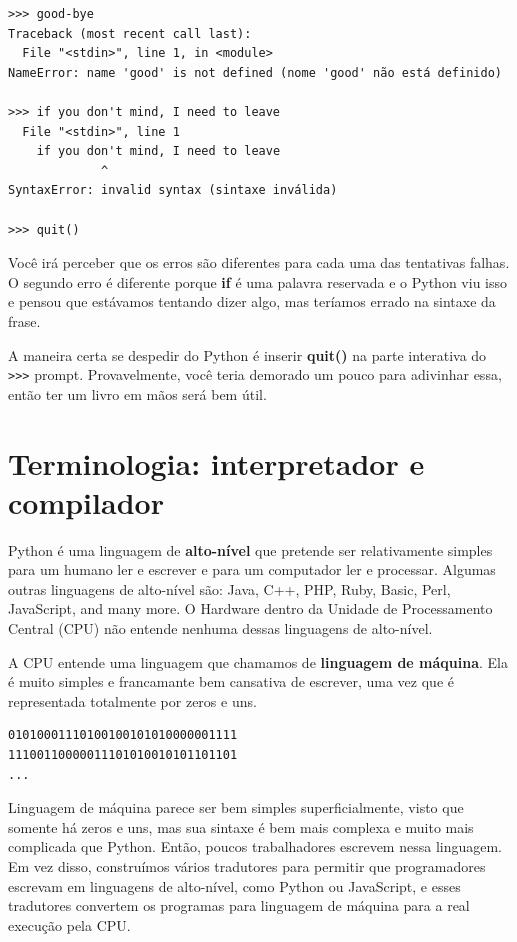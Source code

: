 \begin{verbatim}
>>> good-bye
Traceback (most recent call last):
  File "<stdin>", line 1, in <module>
NameError: name 'good' is not defined (nome 'good' não está definido)

>>> if you don't mind, I need to leave
  File "<stdin>", line 1
    if you don't mind, I need to leave
             ^
SyntaxError: invalid syntax (sintaxe inválida)

>>> quit()
\end{verbatim}

%
Você irá perceber que os erros são diferentes para cada uma das tentativas falhas. O segundo erro é diferente porque {\bf if} é uma palavra reservada e o Python viu isso e pensou que estávamos tentando dizer algo, mas teríamos errado na sintaxe da frase.

A maneira certa se despedir do Python é inserir {\bf quit()} na parte interativa do {\tt >>>} prompt. Provavelmente, você teria demorado um pouco para adivinhar essa, então ter um livro em mãos será bem útil.

\section{Terminologia: interpretador e compilador}
Python é uma  linguagem de {\bf alto-nível} que pretende ser relativamente simples para um humano ler e escrever e para um computador ler e processar. Algumas outras linguagens de alto-nível são: Java, C++,
PHP, Ruby, Basic, Perl, JavaScript, and many more. O Hardware dentro da Unidade de Processamento Central (CPU) não entende nenhuma dessas linguagens de alto-nível.

A CPU entende uma linguagem que chamamos de {\bf linguagem de máquina}. Ela é muito simples e francamante bem cansativa de escrever, uma vez que é representada totalmente por zeros e uns.


\begin{verbatim}
01010001110100100101010000001111
11100110000011101010010101101101
...
\end{verbatim}

%
Linguagem de máquina parece ser bem simples superficialmente, visto que somente há zeros e uns, mas sua sintaxe é bem mais complexa e muito mais complicada que Python.  Então, poucos trabalhadores escrevem nessa linguagem. Em vez disso, construímos vários tradutores para permitir que programadores escrevam em linguagens de alto-nível, como Python ou JavaScript,
e esses tradutores convertem os programas para linguagem de máquina para a real execução pela CPU.

